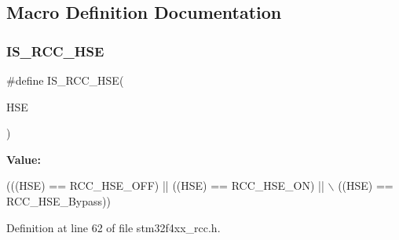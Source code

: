 \subsection{Macro Definition Documentation}
\mbox{\label{group___r_c_c___h_s_e__configuration_ga287bbcafd73d07ec915c2f793301908a}} 
\subsubsection{\texorpdfstring{I\+S\+\_\+\+R\+C\+C\+\_\+\+H\+SE}{IS\_RCC\_HSE}}
{\footnotesize\ttfamily \#define I\+S\+\_\+\+R\+C\+C\+\_\+\+H\+SE(\begin{DoxyParamCaption}\item[{}]{H\+SE }\end{DoxyParamCaption})}

{\bfseries Value\+:}
\begin{DoxyCode}
(((HSE) == RCC\_HSE\_OFF) || ((HSE) == RCC\_HSE\_ON) || \(\backslash\)
                         ((HSE) == RCC\_HSE\_Bypass))
\end{DoxyCode}


Definition at line 62 of file stm32f4xx\+\_\+rcc.\+h.

